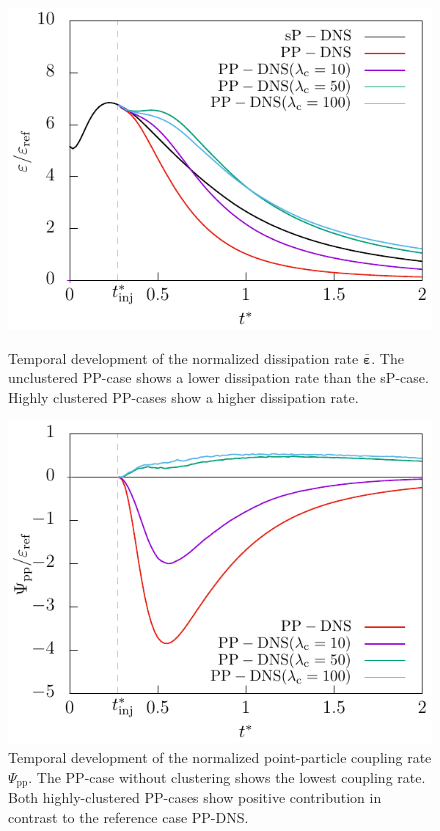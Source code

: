 \documentclass[11pt,a4paper,openany,oneside,parskip=half*]{article}
\renewcommand*\vec[1]{\boldsymbol{#1}}
\begin{document}
\begin{figure}[]
    \centering
    \begin{minipage}[t]{0.5\textwidth}
         \centering
        \includegraphics[width=\linewidth]{./Abbildungen/256/diss_time.pdf}
        \caption{Temporal development of the normalized dissipation rate $\bar{\vec{\varepsilon}}$. The unclustered PP-case shows a lower dissipation rate than the sP-case. Highly clustered PP-cases show a higher dissipation rate.}
        \label{diss_time_256}
    \end{minipage}%
    \begin{minipage}[t]{0.5\textwidth}
        \centering
        \includegraphics[width=\linewidth]{./Abbildungen/256/coupling_time.pdf}
        \caption{Temporal development of the normalized point-particle coupling rate $\Psi_\mathrm{pp}$. The PP-case without clustering shows the lowest coupling rate. Both highly-clustered PP-cases show positive contribution in contrast to the reference case PP-DNS.}
        \label{coupling_time_256}
    \end{minipage}
\end{figure}
\end{document}
